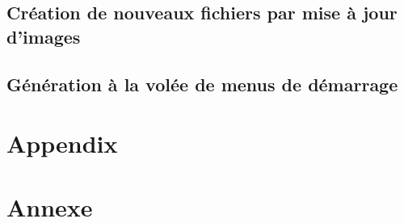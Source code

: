 \ml
{\section{\todo}}
{\section{Création de nouveaux fichiers par mise à jour d’images}}

\ml
{\section{\todo}}
{\section{Génération à la volée de menus de démarrage}}



\appendix

\ml
{\chapter{Appendix}}
{\chapter{Annexe}}
\pagebreak





\singlespacing




